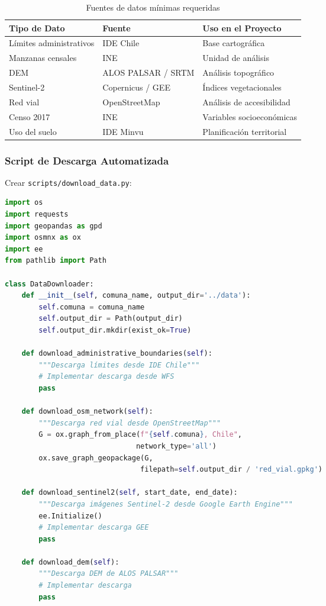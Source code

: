 \documentclass[12pt,a4paper]{article}
\begin{document}
\begin{table}[H]
\centering
\begin{tabular}{llp{5cm}}
\toprule
\textbf{Tipo de Dato} & \textbf{Fuente} & \textbf{Uso en el Proyecto} \\
\midrule
Límites administrativos & IDE Chile & Base cartográfica \\
Manzanas censales & INE & Unidad de análisis \\
DEM & ALOS PALSAR / SRTM & Análisis topográfico \\
Sentinel-2 & Copernicus / GEE & Índices vegetacionales \\
Red vial & OpenStreetMap & Análisis de accesibilidad \\
Censo 2017 & INE & Variables socioeconómicas \\
Uso del suelo & IDE Minvu & Planificación territorial \\
\bottomrule
\end{tabular}
\caption{Fuentes de datos mínimas requeridas}
\end{table}

\subsubsection{Script de Descarga Automatizada}

Crear \texttt{scripts/download\_data.py}:

\begin{lstlisting}[language=Python]
import os
import requests
import geopandas as gpd
import osmnx as ox
import ee
from pathlib import Path

class DataDownloader:
    def __init__(self, comuna_name, output_dir='../data'):
        self.comuna = comuna_name
        self.output_dir = Path(output_dir)
        self.output_dir.mkdir(exist_ok=True)

    def download_administrative_boundaries(self):
        """Descarga límites desde IDE Chile"""
        # Implementar descarga desde WFS
        pass

    def download_osm_network(self):
        """Descarga red vial desde OpenStreetMap"""
        G = ox.graph_from_place(f"{self.comuna}, Chile",
                               network_type='all')
        ox.save_graph_geopackage(G,
                                filepath=self.output_dir / 'red_vial.gpkg')

    def download_sentinel2(self, start_date, end_date):
        """Descarga imágenes Sentinel-2 desde Google Earth Engine"""
        ee.Initialize()
        # Implementar descarga GEE
        pass

    def download_dem(self):
        """Descarga DEM de ALOS PALSAR"""
        # Implementar descarga
        pass
\end{lstlisting}
\end{document}
